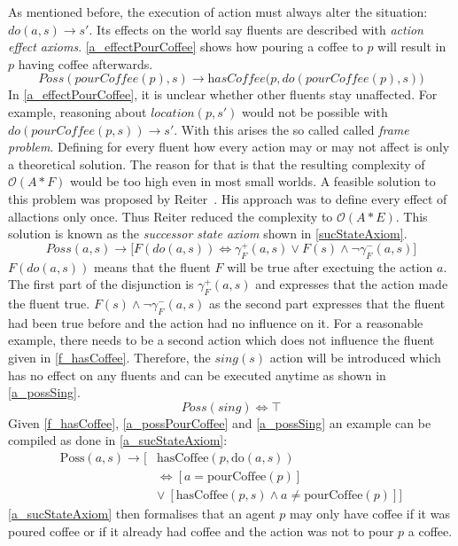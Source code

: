 As mentioned before, the execution of action must always alter the situation: $\textit{do}(a,s) \rightarrow s'$. Its effects on the world say fluents are described with \emph{action effect axioms}. \autoref{a_effectPourCoffee} shows how pouring a coffee to $p$ will result in $p$ having coffee afterwards.
\begin{equation}\label{a_effectPourCoffee}
  \textit{Poss}(\textit{pourCoffee}(p),s) \rightarrow \textit{hasCoffee}\big(p,\textit{do}(\textit{pourCoffee}(p),s)\big)
\end{equation}
In \autoref{a_effectPourCoffee}, it is unclear whether other fluents stay unaffected. For example, reasoning about $location(p,s')$ would not be possible with $\textit{do}(\textit{pourCoffee}(p,s)) \rightarrow s'$. With this arises the so called called \emph{frame problem}. Defining for every fluent how every action may or may not affect is only a theoretical solution. The reason for that is that the resulting complexity of $\mathcal{O}(A*F)$ would be too high even in most small worlds. A feasible solution to this problem was proposed by Reiter~\cite{reiter_frame_1991}. His approach was to define every effect of allactions only once. Thus Reiter reduced the complexity to $\mathcal{O}(A*E)$. This solution is known as the \emph{successor state axiom} shown in \autoref{sucStateAxiom}.
\begin{equation}\label{sucStateAxiom}
  \mathit{Poss}(a,s)\rightarrow \big[\mathit{F}(\mathit{do}(a,s)) \Leftrightarrow\gamma_\mathit{F}^+(a,s)\vee\mathit{F}(s)\wedge\neg\gamma_\mathit{F}^-(a,s)\big]
\end{equation}
$\mathit{F}(\mathit{do}(a,s))$ means that the fluent $F$ will be true after exectuing the action $a$. The first part of the disjunction is $\gamma_\mathit{F}^+(a,s)$ and expresses that the action made the fluent true. $\mathit{F}(s)\wedge\neg\gamma_\mathit{F}^-(a,s)$ as the second part expresses that the fluent had been true before and the action had no influence on it. For a reasonable example, there needs to be a second action which does not influence the fluent given in \autoref{f_hasCoffee}. Therefore, the $sing(s)$ action will be introduced which has no effect on any fluents and can be executed anytime as shown in \autoref{a_possSing}.
\begin{equation}\label{a_possSing}
  \mathit{Poss}(\mathit{sing}) \Leftrightarrow \top
\end{equation}
Given \autoref{f_hasCoffee}, \autoref{a_possPourCoffee} and \autoref{a_possSing} an example can be compiled as done in \autoref{a_sucStateAxiom}:
\begin{equation}\label{a_sucStateAxiom}
  \begin{split}
    \mathrm{Poss}(a,s)\rightarrow \big[&\mathrm{hasCoffee}(p,\mathrm{do}(a,s))
\\    &\Leftrightarrow [a=\mathrm{pourCoffee}(p)]
\\    &\vee\ [\mathrm{hasCoffee}(p,s) \wedge a\neq \mathrm{pourCoffee}(p)]\big]
  \end{split}
\end{equation}
\autoref{a_sucStateAxiom} then formalises that an agent $p$ may only have coffee if it was poured coffee or if it already had coffee and the action was not to pour $p$ a coffee.
